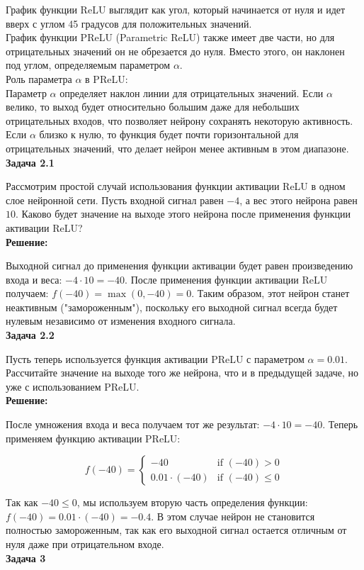 График функции ReLU выглядит как угол, который начинается от нуля и идет вверх с углом 45 градусов для положительных значений.\\
График функции PReLU (Parametric ReLU) также имеет две части, но для отрицательных значений он не обрезается до нуля. Вместо этого, он наклонен под углом, определяемым параметром $\alpha$. \\
Роль параметра $\alpha$ в PReLU:\\
Параметр $\alpha$ определяет наклон линии для отрицательных значений. Если $\alpha$ велико, то выход будет относительно большим даже для небольших отрицательных входов, что позволяет нейрону сохранять некоторую активность. Если $\alpha$ близко к нулю, то функция будет почти горизонтальной для отрицательных значений, что делает нейрон менее активным в этом диапазоне.\\
\textbf{Задача 2.1}

Рассмотрим простой случай использования функции активации ReLU в одном слое нейронной сети. Пусть входной сигнал равен $-4$, а вес этого нейрона равен $10$. Каково будет значение на выходе этого нейрона после применения функции активации ReLU?\\
\textbf{Решение:}

Выходной сигнал до применения функции активации будет равен произведению входа и веса: $-4 \cdot 10 = -40$. После применения функции активации ReLU получаем: $f(-40) = \max(0, -40) = 0$. Таким образом, этот нейрон станет неактивным ("замороженным"), поскольку его выходной сигнал всегда будет нулевым независимо от изменения входного сигнала.\\
\textbf{Задача 2.2}

Пусть теперь используется функция активации PReLU с параметром $\alpha = 0.01$. Рассчитайте значение на выходе того же нейрона, что и в предыдущей задаче, но уже с использованием PReLU.\\
\textbf{Решение:}

После умножения входа и веса получаем тот же результат: $-4 \cdot 10 = -40$. Теперь применяем функцию активации PReLU:

$$ f(-40) = \begin{cases}
		-40              & \text{if } (-40) > 0    \\
		0.01 \cdot (-40) & \text{if } (-40) \leq 0
	\end{cases} $$

Так как $-40 \leq 0$, мы используем вторую часть определения функции: $f(-40) = 0.01 \cdot (-40) = -0.4$. В этом случае нейрон не становится полностью замороженным, так как его выходной сигнал остается отличным от нуля даже при отрицательном входе.\\
\textbf{Задача 3}

